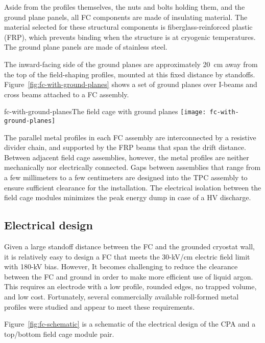 Aside from the profiles themselves, the nuts and bolts holding them, and the ground plane panels, all FC components are made of insulating material. The material selected for these structural components is fiberglass-reinforced plastic (FRP), which prevents binding when the structure is at cryogenic temperatures. The ground plane panels are made of stainless steel. 

The inward-facing side of the ground planes are approximately 20~cm away from the top of the field-shaping profiles, mounted at this fixed distance %
by standoffs. Figure~\ref{fig:fc-with-ground-planes} shows a set of ground planes over I-beams and cross beams attached to a FC assembly.

\begin{cdrfigure}{fc-with-ground-planes}{The field cage with ground planes}
\texttt{[image: fc-with-ground-planes]}
\end{cdrfigure}

The parallel metal profiles in each FC assembly 
 are interconnected by a resistive divider chain, and supported by the FRP beams that span the drift distance.  Between adjacent field cage assemblies, however,  
the metal profiles are neither mechanically nor electrically connected. Gaps between assemblies that range from a few millimeters to a few centimeters are designed into the TPC assembly to ensure sufficient clearance for the installation.  The electrical isolation between the field cage modules minimizes the peak energy dump in case of a HV discharge.


\subsection{Electrical design}

Given a large standoff distance between the FC and the grounded cryostat wall, it is relatively easy to design a FC that meets the 30-kV/cm electric field limit with 180-kV bias.  However, It becomes challenging to reduce the clearance between the FC and ground in order to make more efficient use of liquid argon.  This requires an electrode with a low profile, rounded edges, no trapped volume, and low cost.  Fortunately, several commercially available roll-formed metal profiles were studied and appear to meet these requirements. 

Figure~\ref{fig:fc-schematic} is a schematic of the electrical design of  the CPA and a top/bottom field cage module pair.

